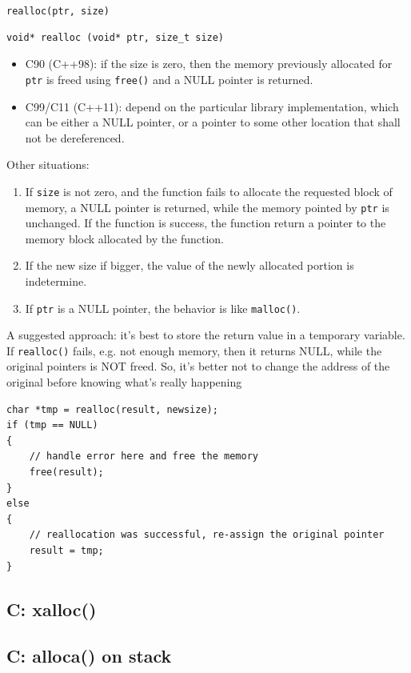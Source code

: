 \verb!realloc(ptr, size)!
\begin{verbatim}
void* realloc (void* ptr, size_t size)
\end{verbatim}
\begin{itemize}
  \item C90 (C++98): if the size is zero, then the memory previously allocated
  for \verb!ptr! is freed using \verb!free()! and a NULL pointer is returned.
  \item C99/C11 (C++11): depend on the particular library implementation, which
  can be either a NULL pointer, or a pointer to some other location that shall
  not be dereferenced.
\end{itemize}
Other situations:
\begin{enumerate}
  \item  If \verb!size! is not zero, and the function fails to allocate the requested
block of memory, a NULL pointer is returned, while the memory pointed by
\verb!ptr! is unchanged. If the function is success,  the function return a
pointer to the memory block allocated by the function.
  \item If the new size if bigger, the value of the newly allocated portion is
  indetermine.
  \item If \verb!ptr! is a NULL pointer, the behavior is like \verb!malloc()!.
\end{enumerate}

A suggested approach: it's best to store the return value in a temporary
variable. If \verb!realloc()! fails, e.g. not enough memory, then it returns
NULL, while the original pointers is NOT freed. So, it's better not to change
the address of the original before knowing what's really happening
\begin{verbatim}
char *tmp = realloc(result, newsize);
if (tmp == NULL)
{
    // handle error here and free the memory
    free(result);
}
else
{
    // reallocation was successful, re-assign the original pointer
    result = tmp;
}
\end{verbatim}

\subsection{C: xalloc()}
\label{sec:xalloc()}

\subsection{C: alloca() on stack}
\label{sec:alloca()}

